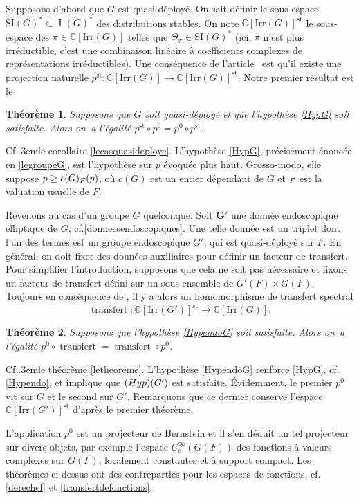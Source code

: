 \documentclass[11pt]{article}
\newcommand{\cf}{cf.\xspace}
\numberwithin{equation}{section}\providecommand{\og}{«\,}\providecommand{\fg}{\,»}
\newcommand{\NoChangel}[1]{%
\expandafter\let\csname old\string#1\endcsname=#1
\let#1=\relax
\newcommand{#1}{\mathcode`l="716C\csname old\string#1\endcsname\mathcode`l="7160 }%
}
\newcommand\Cf{Cf.\kern.3em}
\newcommand{\rc}{\mathrm{c}}
\newcommand{\Hyp}{\textup{Hyp}}
\newcommand{\Irr}{\mathrm{Irr}}
\newcommand{\SI}{\mathrm{SI}}
\newcommand{\st}{\mathrm{st}}
\DeclareMathOperator{\rI}{I}
\DeclareMathOperator{\transfert}{transfert}
\DeclareMathOperator{\val}{val} \NoChangel{\val}
\newcommand{\bG}{\boldsymbol{G}}
\newcommand{\CC}{\mathbb{C}}
\theoremstyle{plain}
\newtheorem{thm}{Théorème}
\theoremstyle{definition}
\begin{document}
Supposons d'abord que $G$ est quasi-déployé. On sait définir le sous-espace $\SI(G)^*\subset \rI(G)^*$ des distributions stables. On note $\CC[\Irr(G)]^{\st}$ le sous-espace des $\pi\in \CC[\Irr(G)]$ telles que $\Theta_{\pi}\in \SI(G)^*$ (ici, $\pi$ n'est plus irréductible, c'est une combinaison linéaire à coefficients complexes de représentations irréductibles). Une conséquence de l'arti\-cle~\cite{A3} est qu'il existe une projection naturelle $p^{\st}:\CC[\Irr(G)]\to \CC[\Irr(G)]^{\st}$. Notre premier résultat est le

\begin{thm}\label{th:1}
Supposons que $G$ soit quasi-déployé et que l'hypothèse \ref{HypG} soit satisfaite. Alors on~a l'égalité $p^{\st}\circ p^0=p^0\circ p^{\st}$.
\end{thm}

\Cf le corollaire \ref{lecasquasideploye}. L'hypothèse \ref{HypG}, précisément énoncée en \ref{legroupeG}, est l'hypothèse sur $p$ évoquée plus haut. Grosso-modo, elle suppose $p\geq c(G)\val_{F}(p)$, où $c(G)$ est un entier dépendant de $G$ et $\val_{F}$ est la valuation usuelle de $F$.

Revenons au cas d'un groupe $G$ quelconque. Soit $\bG'$ une donnée endoscopique elliptique de $G$, \cf \ref{donneesendoscopiques}. Une telle donnée est un triplet dont l'un des termes est un groupe endoscopique $G'$, qui est quasi-déployé sur $F$. En général, on doit fixer des données auxiliaires pour définir un facteur de transfert. Pour simplifier l'introduction, supposons que cela ne soit pas nécessaire et fixons un facteur de transfert défini sur un sous-ensemble de $G'(F)\times G(F)$. Toujours en conséquence de \cite{A3}, il y a alors un homomorphisme de transfert spectral
\[
\transfert:\CC[\Irr(G')]^{\st}\to \CC[\Irr(G)].
\]

\begin{thm}\label{th:2}
Supposons que l'hypothèse \ref{HypendoG} soit satisfaite. Alors on~a l'égalité $p^0\circ \transfert=\transfert\circ p^0$.
\end{thm}

\Cf le théorème \ref{letheoreme}. L'hypothèse \ref{HypendoG} renforce \ref{HypG}, \cf \ref{Hypendo}, et implique que $(\Hyp)(G')$ est satisfaite. Évidemment, le premier $p^0$ vit sur $G$ et le second sur $G'$. Remarquons que ce dernier conserve l'espace $\CC[\Irr(G')]^{\st}$ d'après le premier théorème.

L'application $p^0$ est un projecteur de Bernstein et il s'en déduit un tel projecteur sur divers objets, par exemple l'espace $C_{\rc}^{\infty}(G(F))$ des fonctions à valeurs complexes sur $G(F)$, localement constantes et à support compact. Les théorèmes ci-dessus ont des contreparties pour les espaces de fonctions, \cf \ref{derechef} et \ref{transfertdefonctions}.
\end{document}
